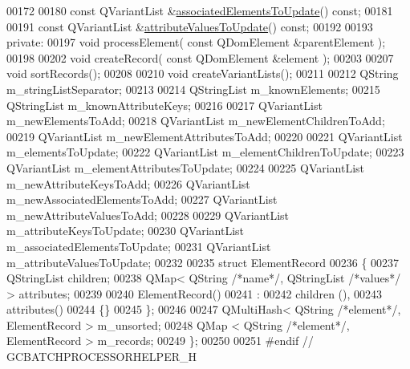 \begin{DoxyCode}
00172 
00180   \textcolor{keyword}{const} QVariantList &\hyperlink{class_g_c_batch_processor_helper_a22c3d5f21c3dff029e89536c0a08daf4}{associatedElementsToUpdate}() \textcolor{keyword}{const};
00181 
00191   \textcolor{keyword}{const} QVariantList &\hyperlink{class_g_c_batch_processor_helper_a390cab72c76739bea0d98d5ba1ff7e21}{attributeValuesToUpdate}() \textcolor{keyword}{const};
00192 
00193 \textcolor{keyword}{private}:
00197   \textcolor{keywordtype}{void} processElement( \textcolor{keyword}{const} QDomElement &parentElement );
00198 
00202   \textcolor{keywordtype}{void} createRecord( \textcolor{keyword}{const} QDomElement &element );
00203 
00207   \textcolor{keywordtype}{void} sortRecords();
00208 
00210   \textcolor{keywordtype}{void} createVariantLists();
00211 
00212   QString m\_stringListSeparator;
00213 
00214   QStringList  m\_knownElements;
00215   QStringList  m\_knownAttributeKeys;
00216 
00217   QVariantList m\_newElementsToAdd;
00218   QVariantList m\_newElementChildrenToAdd;
00219   QVariantList m\_newElementAttributesToAdd;
00220 
00221   QVariantList m\_elementsToUpdate;
00222   QVariantList m\_elementChildrenToUpdate;
00223   QVariantList m\_elementAttributesToUpdate;
00224 
00225   QVariantList m\_newAttributeKeysToAdd;
00226   QVariantList m\_newAssociatedElementsToAdd;
00227   QVariantList m\_newAttributeValuesToAdd;
00228 
00229   QVariantList m\_attributeKeysToUpdate;
00230   QVariantList m\_associatedElementsToUpdate;
00231   QVariantList m\_attributeValuesToUpdate;
00232 
00235   \textcolor{keyword}{struct }ElementRecord
00236   \{
00237     QStringList children;
00238     QMap< QString \textcolor{comment}{/*name*/}, QStringList \textcolor{comment}{/*values*/} > attributes;
00239 
00240     ElementRecord()
00241       :
00242         children  (),
00243         attributes()
00244     \{\}
00245   \};
00246 
00247   QMultiHash< QString \textcolor{comment}{/*element*/}, ElementRecord > m\_unsorted;
00248   QMap      < QString \textcolor{comment}{/*element*/}, ElementRecord > m\_records;
00249 \};
00250 
00251 \textcolor{preprocessor}{#endif // GCBATCHPROCESSORHELPER\_H}
\end{DoxyCode}
